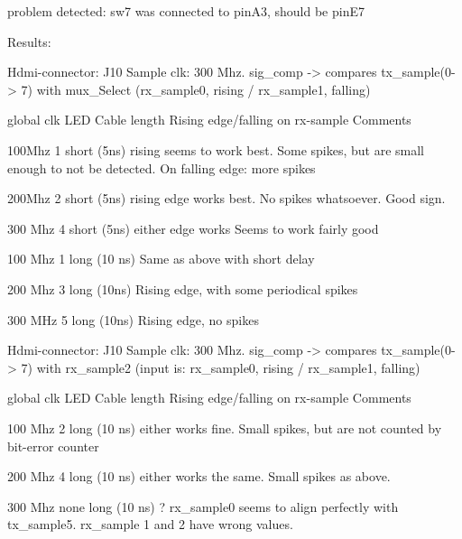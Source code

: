 \documentclass[main.tex]{subfiles}
\begin{document}
problem detected: sw7 was connected to pinA3, should be pinE7


Results:

Hdmi-connector: J10
Sample clk: 300 Mhz. 
sig_comp -> compares tx_sample(0-> 7) with mux_Select (rx_sample0, rising / rx_sample1, falling)

global clk 	LED 	Cable length 	Rising edge/falling on rx-sample 	Comments

100Mhz	1 	short (5ns) 	rising seems to work best. 		Some spikes, but are small enough to not be detected. On falling edge: more spikes

200Mhz 	2 	short (5ns) 	rising edge works best.			No spikes whatsoever. Good sign.

300 Mhz 	4 	short (5ns) 	either edge works 			Seems to work fairly good


100 Mhz 	1 	long (10 ns) 	Same as above with short delay

200 Mhz 	3	long (10ns) 	Rising edge, with some periodical spikes

300 MHz 	5 	long (10ns)	Rising edge, no spikes 		



Hdmi-connector: J10
Sample clk: 300 Mhz. 
sig_comp -> compares tx_sample(0-> 7) with rx_sample2 (input is: rx_sample0, rising / rx_sample1, falling)

global clk 	LED 	Cable length 	Rising edge/falling on rx-sample 	Comments

100 Mhz 	2 	long (10 ns) 	either works fine.			Small spikes, but are not counted by bit-error counter

200 Mhz	4 	long (10 ns)	either works the same.			Small spikes as above.

300 Mhz	none 	long (10 ns)	? 					rx_sample0 seems to align perfectly with tx_sample5. rx_sample 1 and 2 have wrong values.
\end{document}
